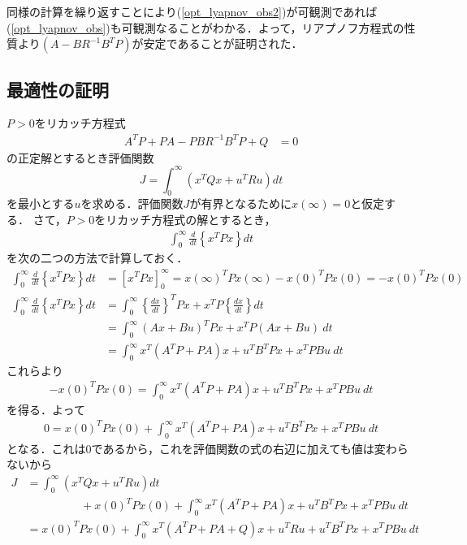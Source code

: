 同様の計算を繰り返すことにより(\ref{opt_lyapnov_obs2})が可観測であれば(\ref{opt_lyapnov_obs})も可観測なることがわかる．よって，リアプノフ方程式の性質より$(A - B R^{-1} B^T P)$が安定であることが証明された．　

\subsection{最適性の証明}

$P>0$をリカッチ方程式
\begin{align}
	A^T P + P A - P B R^{-1} B^T P + Q &= 0
\end{align}
の正定解とするとき評価関数
\begin{equation}
 J = \int_{0}^{\infty} (x^T Q x + u^T R u) dt
\end{equation}
を最小とする$u$を求める．評価関数$J$が有界となるために$x(\infty) = 0$と仮定する．
さて，$P>0$をリカッチ方程式の解とするとき，
\begin{align}
	\int_0^\infty \frac{d}{dt}\left\{x^T P x \right\}  dt
\end{align}
を次の二つの方法で計算しておく．
\begin{align}
	\int_0^\infty \frac{d}{dt}\left\{x^T P x \right\}  dt 
		&= \left[ x^T P x \right]_0^\infty 
		= x(\infty)^T P x(\infty) - x(0)^T P x(0)= - x(0)^T P x(0)
\\
	\int_0^\infty \frac{d}{dt}\left\{x^T P x \right\}  dt 
		&= \int_0^\infty \left\{ \frac{dx}{dt} \right\}^T P x + x^T P\left\{ \frac{dx}{dt} \right\} dt 
\nonumber \\
		&= \int_0^\infty (Ax + Bu)^T P x + x^T P (Ax + Bu) \ dt
\nonumber\\
		&= \int_0^\infty x^T (A^T P + PA) x + u^T B^T P x + x^T P B u \ dt
\end{align}
これらより
\begin{align}
	- x(0)^T P x(0) = \int_0^\infty x^T (A^T P + PA) x + u^T B^T P x + x^T P B u \ dt
\end{align}
を得る．よって
\begin{align}
	0= x(0)^T P x(0) + \int_0^\infty x^T (A^T P + PA) x + u^T B^T P x + x^T P B u \ dt
\end{align}
となる．これは$0$であるから，これを評価関数の式の右辺に加えても値は変わらないから
\begin{align}
	J &= \int_{0}^{\infty} (x^T Q x + u^T R u) dt 
\nonumber \\ & \hspace{2cm}
		+ x(0)^T P x(0) + \int_0^\infty x^T (A^T P + PA) x + u^T B^T P x + x^T P B u \ dt
\nonumber \\
	 &= x(0)^T P x(0)
		+ \int_{0}^{\infty} x^T(A^T P + PA + Q) x 
		+ u^T R u + u^T B^T P x + x^T P B u \ dt
\end{align}
